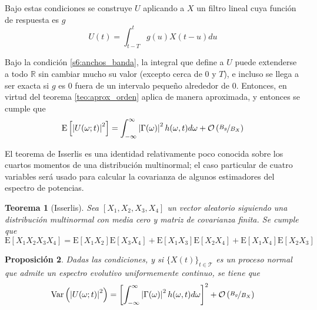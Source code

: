 \documentclass[12pt,letterpaper]{book}
\newtheorem{teorema}{Teorema}[chapter]
\newtheorem{proposicion}[teorema]{Proposición}
\newcommand{\R}{\mathbb{R}}
\newcommand{\intR}{\int_{-\infty}^{\infty}}
\newcommand{\E}[1]{\mathrm{E}\left[ #1 \right]}
\newcommand{\Var}[1]{\mathrm{Var}\left( #1 \right)}
\newcommand{\abso}[1]{\left| #1 \right|}
\newcommand{\xt}{$\{X(t)\}_{t\in \mathcal{T}}$ }
\newcommand{\orden}[1]{\mathcal{O}\left( #1 \right)}
\begin{document}
Bajo estas condiciones se construye $U$ aplicando a $X$ un filtro lineal cuya función de respuesta es $g$
\begin{equation}
U(t) = \int_{t-T}^{t} g(u) X(t-u) du
\end{equation}

Bajo la condición \ref{s6:anchos_banda}, la integral que define a $U$ puede extenderse a todo $\R$ sin cambiar mucho su valor (excepto cerca de 0 y $T$), e incluso se llega a ser exacta si $g$ es 0 fuera de un intervalo pequeño alrededor de 0. Entonces, en virtud del teorema \ref{teo:aprox_orden} aplica de manera aproximada, y entonces se cumple que
\begin{equation}
\E{\abso{U(\omega; t)}^{2}} = \intR \abso{\Gamma(\omega)}^{2} h(\omega, t)d\omega + \orden{\nicefrac{B_g}{B_X}}
\end{equation}

El teorema de Isserlis es una identidad relativamente poco conocida sobre los cuartos momentos de una distribución multinormal; el caso particular de cuatro variables será usado para calcular la covarianza de algunos estimadores del espectro de potencias.

\begin{teorema}[Isserlis]
Sea $[X_1, X_2, X_3, X_4]$ un vector aleatorio siguiendo una distribución multinormal con media cero y matriz de covarianza finita. Se cumple que
\begin{equation}
\E{X_1 X_2 X_3 X_4} = \E{X_1 X_2} \E{X_3 X_4} + \E{X_1 X_3} \E{X_2 X_4} + \E{X_1 X_4} \E{X_2 X_3}
\end{equation}
\label{teo:isserlis}
\end{teorema}

\begin{proposicion}
Dadas las condiciones, y si \xt es un proceso normal que admite un espectro evolutivo uniformemente continuo, se tiene que
\begin{equation}
\Var{\abso{U(\omega;t)}^{2}} = \left[ \intR \abso{\Gamma(\omega)}^{2} h(\omega, t)d\omega \right]^{2} + \orden{\nicefrac{B_g}{B_X}}
\end{equation}
\end{proposicion}
\end{document}
